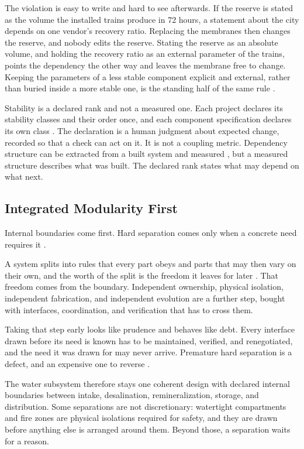 The violation is easy to write and hard to see afterwards. If the reserve is stated as the volume the installed trains produce in 72 hours, a statement about the city depends on one vendor's recovery ratio. Replacing the membranes then changes the reserve, and nobody edits the reserve. Stating the reserve as an absolute volume, and holding the recovery ratio as an external parameter of the trains, points the dependency the other way and leaves the membrane free to change. Keeping the parameters of a less stable component explicit and external, rather than buried inside a more stable one, is the standing half of the same rule \citep[Section~\hyperlink{nss-6.12}{6.12}]{pss2026}.

Stability is a declared rank and not a measured one. Each project declares its stability classes and their order once, and each component specification declares its own class \citep[Sections~\hyperlink{nss-6.12}{6.12} and~\hyperlink{nss-14.3}{14.3}]{pss2026}. The declaration is a human judgment about expected change, recorded so that a check can act on it. It is not a coupling metric. Dependency structure can be extracted from a built system and measured \citep{baldwin2014}, but a measured structure describes what was built. The declared rank states what may depend on what next.

\subsection{Integrated Modularity First}

Internal boundaries come first. Hard separation comes only when a concrete need requires it \citep{tbf2026}.

A system splits into rules that every part obeys and parts that may then vary on their own, and the worth of the split is the freedom it leaves for later \citep{baldwinclark2000}. That freedom comes from the boundary. Independent ownership, physical isolation, independent fabrication, and independent evolution are a further step, bought with interfaces, coordination, and verification that has to cross them.

Taking that step early looks like prudence and behaves like debt. Every interface drawn before its need is known has to be maintained, verified, and renegotiated, and the need it was drawn for may never arrive. Premature hard separation is a defect, and an expensive one to reverse \citep[Section~\hyperlink{nss-5.4}{5.4}]{pss2026}.

The water subsystem therefore stays one coherent design with declared internal boundaries between intake, desalination, remineralization, storage, and distribution. Some separations are not discretionary: watertight compartments and fire zones are physical isolations required for safety, and they are drawn before anything else is arranged around them. Beyond those, a separation waits for a reason.

